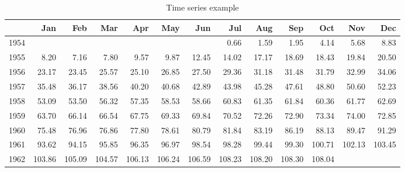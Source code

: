 \begin{table}[htb]
\centering
\begin{tabular}{rrrrrrrrrrrrr}
  \hline
 & Jan & Feb & Mar & Apr & May & Jun & Jul & Aug & Sep & Oct & Nov & Dec \\ 
  \hline
1954 &  &  &  &  &  &  & 0.66 & 1.59 & 1.95 & 4.14 & 5.68 & 8.83 \\ 
  1955 & 8.20 & 7.16 & 7.80 & 9.57 & 9.87 & 12.45 & 14.02 & 17.17 & 18.69 & 18.43 & 19.84 & 20.50 \\ 
  1956 & 23.17 & 23.45 & 25.57 & 25.10 & 26.85 & 27.50 & 29.36 & 31.18 & 31.48 & 31.79 & 32.99 & 34.06 \\ 
  1957 & 35.48 & 36.17 & 38.56 & 40.20 & 40.68 & 42.89 & 43.98 & 45.28 & 47.61 & 48.80 & 50.60 & 52.23 \\ 
  1958 & 53.09 & 53.50 & 56.32 & 57.35 & 58.53 & 58.66 & 60.83 & 61.35 & 61.84 & 60.36 & 61.77 & 62.69 \\ 
  1959 & 63.70 & 66.14 & 66.54 & 67.75 & 69.33 & 69.84 & 70.52 & 72.26 & 72.90 & 73.34 & 74.00 & 72.85 \\ 
  1960 & 75.48 & 76.96 & 76.86 & 77.80 & 78.61 & 80.79 & 81.84 & 83.19 & 86.19 & 88.13 & 89.47 & 91.29 \\ 
  1961 & 93.62 & 94.15 & 95.85 & 96.35 & 96.97 & 98.54 & 98.28 & 99.44 & 99.30 & 100.71 & 102.13 & 103.45 \\ 
  1962 & 103.86 & 105.09 & 104.57 & 106.13 & 106.24 & 106.59 & 108.23 & 108.20 & 108.30 & 108.04 &  &  \\ 
   \hline
\end{tabular}
\caption{Time series example} 
\end{table}
